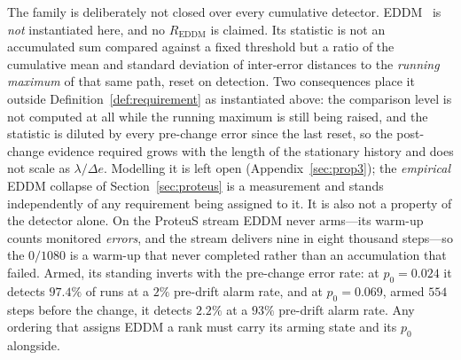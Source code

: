 The family is deliberately not closed over every cumulative detector.
EDDM~\cite{baena_eddm_2006} is \emph{not} instantiated here, and no
$R_{\mathrm{EDDM}}$ is claimed. Its statistic is not an accumulated sum
compared against a fixed threshold but a ratio of the cumulative mean and
standard deviation of inter-error distances to the \emph{running maximum} of
that same path, reset on detection. Two consequences place it outside
Definition~\ref{def:requirement} as instantiated above: the comparison level is
not computed at all while the running maximum is still being raised, and the
statistic is diluted by every pre-change error since the last reset, so the
post-change evidence required grows with the length of the stationary history
and does not scale as $\lambda/\Delta e$. Modelling it is left open
(Appendix~\ref{sec:prop3}); the \emph{empirical} EDDM collapse of
Section~\ref{sec:proteus} is a measurement and stands independently of any
requirement being assigned to it. It is also not a property of the detector
alone. On the ProteuS stream EDDM never arms---its warm-up counts monitored
\emph{errors}, and the stream delivers nine in eight thousand steps---so the
$0/1080$ is a warm-up that never completed rather than an accumulation that
failed. Armed, its standing inverts with the pre-change error rate: at
$p_0 = 0.024$ it detects $97.4\%$ of runs at a $2\%$ pre-drift alarm rate, and
at $p_0 = 0.069$, armed $554$ steps before the change, it detects $2.2\%$ at a
$93\%$ pre-drift alarm rate. Any ordering that assigns EDDM a rank must carry
its arming state and its $p_0$ alongside.


